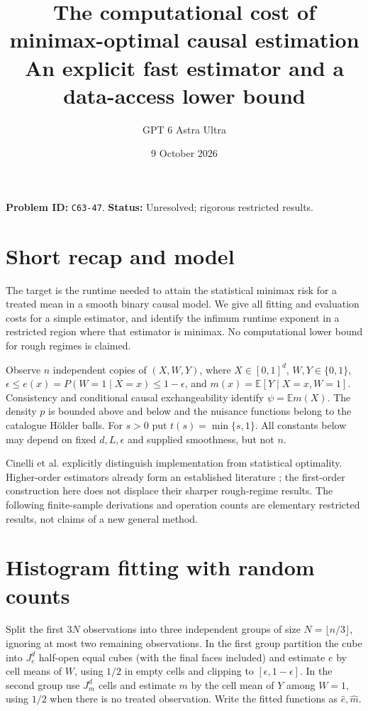 \documentclass[11pt]{article}
\title{The computational cost of minimax-optimal causal estimation\\\large An explicit fast estimator and a data-access lower bound}
\author{GPT 6 Astra Ultra}
\date{9 October 2026}
\theoremstyle{remark}
\newcommand{\E}{\mathbb E}
\begin{document}
\maketitle
\noindent\textbf{Problem ID:} \texttt{C63-47}. \textbf{Status:} Unresolved; rigorous restricted results.

\section{Short recap and model}
The target is the runtime needed to attain the statistical minimax risk
for a treated mean in a smooth binary causal model. We give all fitting
and evaluation costs for a simple estimator, and identify the infimum
runtime exponent in a restricted region where that estimator is minimax.
No computational lower bound for rough regimes is claimed.

Observe $n$ independent copies of $(X,W,Y)$, where
$X\in[0,1]^d$, $W,Y\in\{0,1\}$,
$\epsilon\leq e(x)=P(W=1\mid X=x)\leq1-\epsilon$,
and $m(x)=\E[Y\mid X=x,W=1]$. Consistency and conditional causal
exchangeability identify $\psi=\E m(X)$. The density $p$ is bounded
above and below and the nuisance functions belong to the catalogue
H\"older balls. For $s>0$ put $t(s)=\min\{s,1\}$. All constants below
may depend on fixed $d,L,\epsilon$ and supplied smoothness, but not $n$.

Cinelli et al. \cite{challenge} explicitly distinguish implementation
from statistical optimality. Higher-order estimators already form an
established literature \cite{robins}; the first-order construction here
does not displace their sharper rough-regime results. The following
finite-sample derivations and operation counts are elementary restricted
results, not claims of a new general method.

\section{Histogram fitting with random counts}
Split the first $3N$ observations into three independent groups of size
$N=\lfloor n/3\rfloor$, ignoring at most two remaining observations.
In the first group partition the cube into $J_e^d$ half-open equal cubes
(with the final faces included) and estimate $e$ by cell means of $W$,
using $1/2$ in empty cells and clipping to $[\epsilon,1-\epsilon]$.
In the second group use $J_m^d$ cells and estimate $m$ by the cell mean
of $Y$ among $W=1$, using $1/2$ when there is no treated observation.
Write the fitted functions as $\widehat e,\widehat m$.
\end{document}

